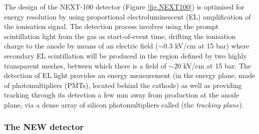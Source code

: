 The design of the NEXT-100 detector (Figure \ref{fig.NEXT100}) is optimised for energy resolution by using proportional electroluminescent (EL) amplification of the ionisation signal. The detection process involves using the prompt scintillation light from the gas as start-of-event time, drifting the ionisation charge to the anode by means of an electric field ($\sim0.3$ kV/cm at 15 bar) where secondary EL scintillation will be produced in the region defined by two highly transparent meshes, between which there is a field of $\sim20$ kV/cm at 15 bar. The detection of EL light provides an energy measurement (in the energy plane, made of photomultipliers (PMTs), located behind the cathode) as well as providing tracking through its detection a few mm away from production at the anode plane, via a dense array of silicon photomultipliers called (the \emph{tracking plane}).


\subsubsection*{The NEW detector}
\label{sec.new}

